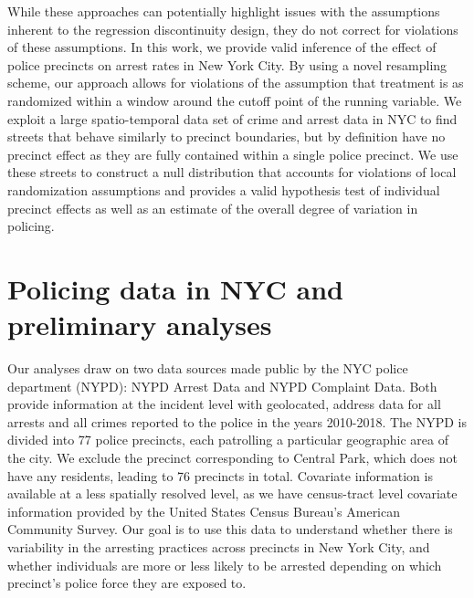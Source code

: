 \documentclass[a4paper,11pt]{article}
\begin{document}
While these approaches can potentially highlight issues with the assumptions inherent to the regression discontinuity design, they do not correct for violations of these assumptions. In this work, we provide valid inference of the effect of police precincts on arrest rates in New York City. By using a novel resampling scheme, our approach allows for violations of the assumption that treatment is as randomized within a window around the cutoff point of the running variable. We exploit a large spatio-temporal data set of crime and arrest data in NYC to find streets that behave similarly to precinct boundaries, but by definition have no precinct effect as they are fully contained within a single police precinct. We use these streets to construct a null distribution that accounts for violations of local randomization assumptions and provides a valid hypothesis test of individual precinct effects as well as an estimate of the overall degree of variation in policing. 

\section{Policing data in NYC and preliminary analyses}
\label{sec:data}
Our analyses draw on two data sources made public  by the NYC police department (NYPD): NYPD Arrest Data and NYPD Complaint Data. Both provide information at the incident level with geolocated, address data for all arrests and all crimes reported to the police in the years 2010-2018. The NYPD is divided into 77 police precincts, each patrolling a particular geographic area of the city. We exclude the precinct corresponding to Central Park, which does not have any residents, leading to 76 precincts in total.  Covariate information is available at a less spatially resolved level, as we have census-tract level covariate information provided by the United States Census Bureau's American Community Survey. Our goal is to use this data to understand whether there is variability in the arresting practices across precincts in New York City, and whether individuals are more or less likely to be arrested depending on which precinct's police force they are exposed to.
\end{document}
